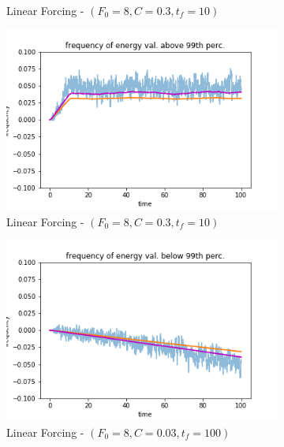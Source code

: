 \documentclass{article}
\begin{document}
\begin{figure}[!ht]
\begin{subfigure}[b]{0.48\textwidth}
		\caption{Linear Forcing - $(F_0=8, C=0.3, t_f=10)$}
		\label{fig:pred_energy_bin_00q_099q_L_03_10}
	\end{subfigure}%
	\begin{subfigure}[b]{0.48\textwidth}
		\includegraphics[width=1\linewidth]{fig/pred_energy_exceed_099q_L_03_10.png}
		\caption{Linear Forcing - $(F_0=8, C=0.3, t_f=10)$}
		\label{fig:pred_energy_exceed_099q_L_03_10}
	\end{subfigure}
	\begin{subfigure}[b]{0.48\textwidth}
		\includegraphics[width=1\linewidth]{fig/pred_energy_bin_00q_099q_L_003_100.png}
		\caption{Linear Forcing - $(F_0=8, C=0.03, t_f=100)$}
		\label{fig:pred_energy_bin_00q_099q_L_003_100}
	\end{subfigure}%
	\begin{subfigure}[b]{0.48\textwidth}

\end{subfigure}
\end{figure}
\end{document}
